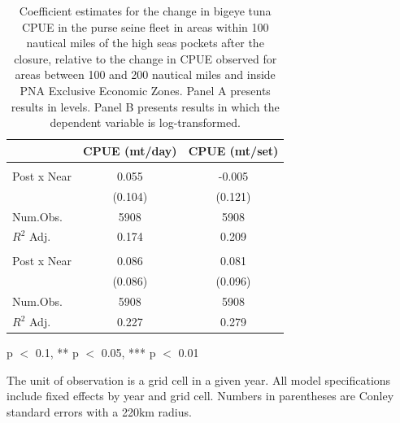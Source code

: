 \begin{table}
\centering
\begin{threeparttable}
\small
\caption{\label{tab:h3_reg_bet_ps}Coefficient estimates for the change in bigeye tuna CPUE in the purse seine fleet in
             areas within 100 nautical miles of the high seas pockets after the closure, relative to the change in CPUE
             observed for areas between 100 and 200 nautical miles and inside PNA Exclusive Economic Zones.
             Panel A presents results in levels. Panel B presents results in which the dependent variable is log-transformed.}
\centering
\begin{tabular}[t]{lcc}
\toprule
  & CPUE (mt/day) & CPUE (mt/set)\\
\midrule
\addlinespace[0.5em]
\multicolumn{3}{l}{\textit{A) Levels}}\\
\midrule \hspace{1em}Post x Near & 0.055 & -0.005\\
\hspace{1em} & (0.104) & (0.121)\\
\hspace{1em}Num.Obs. & 5908 & \vphantom{1} 5908\\
\hspace{1em}$R^2$ Adj. & 0.174 & 0.209\\
\addlinespace[0.5em]
\multicolumn{3}{l}{\textit{B) Log-transformed}}\\
\midrule \hspace{1em}Post x Near & 0.086 & 0.081\\
\hspace{1em} & (0.086) & (0.096)\\
\hspace{1em}Num.Obs. & 5908 & 5908\\
\hspace{1em}$R^2$ Adj. & 0.227 & 0.279\\
\bottomrule
\end{tabular}
\begin{tablenotes}
\small
\item * p $<$ 0.1, ** p $<$ 0.05, *** p $<$ 0.01
\item The unit of observation is a grid cell in a given year. All model specifications include fixed effects by year and grid cell. Numbers in parentheses are Conley standard errors with a 220km radius.
\end{tablenotes}
\end{threeparttable}
\end{table}
